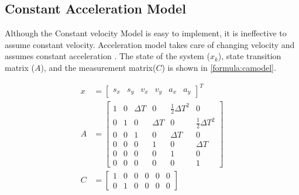 \subsection{Constant Acceleration Model}
Although the Constant velocity Model is easy to implement, it is ineffective to assume constant velocity. Acceleration model takes care of changing velocity and assumes constant acceleration \cite{Schubert2008}. The state of the system ($x_k$), state transition matrix ($A$), and the measurement matrix($C$) is shown in \eqref{formula:camodel}.

\begin{equation}
\label{formula:camodel}
\begin{split}
x&= \left[\begin{matrix}
s_x & s_y & v_x & v_y & a_x & a_y
\end{matrix}\right]^{T}\\
A&= \left[\begin{matrix}
1 & 0 & \Delta T & 0 & \frac{1}{2}\Delta T^2 & 0\\
0 & 1 & 0 & \Delta T & 0 & \frac{1}{2}\Delta T^2 \\
0 & 0 & 1 & 0 & \Delta T & 0\\
0 & 0 & 0 & 1 & 0 & \Delta T\\
0 & 0 & 0 & 0 & 1 & 0\\
0 & 0 & 0 & 0 & 0 & 1
\end{matrix}\right] \\
C&= \left[\begin{matrix}
1 & 0 & 0 & 0 & 0 & 0\\
0 & 1 & 0 & 0 & 0 & 0
\end{matrix}\right]
\end{split}
\end{equation}

